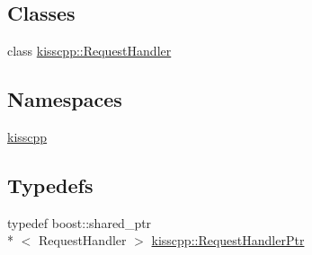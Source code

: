 \subsection*{Classes}
\begin{DoxyCompactItemize}
\item 
class \hyperlink{a00037}{kisscpp\-::\-Request\-Handler}
\end{DoxyCompactItemize}
\subsection*{Namespaces}
\begin{DoxyCompactItemize}
\item 
\hyperlink{a00089}{kisscpp}
\end{DoxyCompactItemize}
\subsection*{Typedefs}
\begin{DoxyCompactItemize}
\item 
typedef boost\-::shared\-\_\-ptr\\*
$<$ Request\-Handler $>$ \hyperlink{a00089_a21e40edcd4f1a3c7c1cc0015b576c8e5}{kisscpp\-::\-Request\-Handler\-Ptr}
\end{DoxyCompactItemize}
